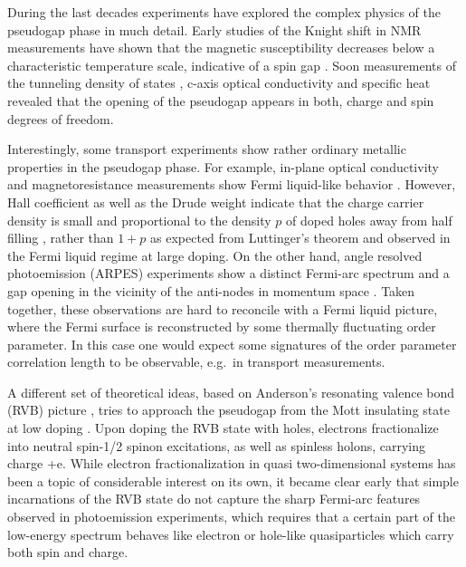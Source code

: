 \documentclass[aps,pra,reprint,showpacs,superscriptaddress]{revtex4-1}
\begin{document}
During the last decades experiments have explored the complex physics of the pseudogap phase in much detail.
Early studies of the Knight shift in NMR measurements have shown that the magnetic susceptibility decreases below a characteristic temperature scale, indicative of a spin gap \cite{alloul198989,curro1997high}. Soon measurements of the tunneling density of states \cite{renner1998pseudogap}, c-axis optical conductivity \cite{homes1993optical, uchida1997spin} and specific heat \cite{loram1993electronic,loram2001evidence} revealed that the opening of the pseudogap appears in both, charge and spin degrees of freedom. 

Interestingly, some transport experiments show rather ordinary metallic properties in the pseudogap phase. For example, in-plane
optical conductivity and magnetoresistance measurements show Fermi liquid-like behavior \cite{mirzaei2013spectroscopic,chan2014plane}. 
However, Hall coefficient as well as the Drude weight indicate that the charge carrier density is small and proportional to the density $p$ of doped holes away from half filling \cite{orenstein1990frequency,uchida1991optical,cooper1993optical,padilla2005constant,badoux2015change}, rather than $1+p$ as expected from Luttinger's theorem and observed in the Fermi liquid regime at large doping.
On the other hand, angle resolved photoemission (ARPES) experiments show a distinct Fermi-arc spectrum and a gap opening in the vicinity of the anti-nodes in momentum space \cite{damascelli2003angle,shen2005nodal,hashimoto2015energy,shen1993anomalously,ding1996angle,hussain2007abrupt,vishik2012phase,vishik2010arpes}. Taken together, these observations are hard to reconcile with a Fermi liquid picture, where the Fermi surface is reconstructed by some thermally fluctuating order parameter. In this case one would expect some signatures of the order parameter correlation length to be observable, e.g.~in transport measurements.

A different set of theoretical ideas, based on Anderson's resonating valence bond (RVB) picture \cite{anderson1973resonating,fazekas1974ground,anderson1987resonating}, tries to approach the pseudogap from the Mott insulating state at low doping \cite{lee2006doping}. Upon doping the RVB state with holes, electrons fractionalize into neutral spin-1/2 spinon excitations, as well as spinless holons, carrying charge +e. While electron fractionalization in quasi two-dimensional systems has been a topic of considerable interest on its own, it became clear early that simple incarnations of the RVB state do not capture the sharp Fermi-arc features observed in photoemission experiments, which requires that a certain part of the low-energy spectrum behaves like electron or hole-like quasiparticles which carry both spin and charge.
\end{document}
